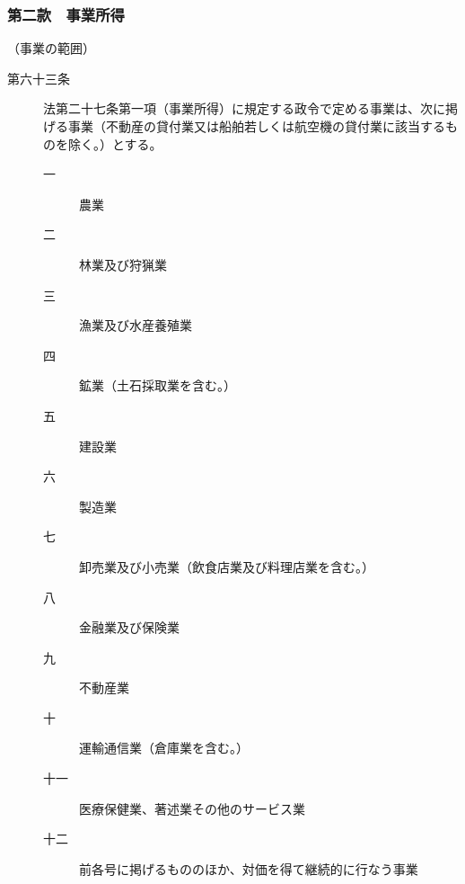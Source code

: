 \documentclass[twocolumn,a4j,10pt]{ltjtarticle}
\begin{document}
\subsubsection*{第二款　事業所得}
\noindent\hspace{10pt}（事業の範囲）
\begin{description}
\item[第六十三条]法第二十七条第一項（事業所得）に規定する政令で定める事業は、次に掲げる事業（不動産の貸付業又は船舶若しくは航空機の貸付業に該当するものを除く。）とする。
\begin{description}
\item[一]農業
\item[二]林業及び狩猟業
\item[三]漁業及び水産養殖業
\item[四]鉱業（土石採取業を含む。）
\item[五]建設業
\item[六]製造業
\item[七]卸売業及び小売業（飲食店業及び料理店業を含む。）
\item[八]金融業及び保険業
\item[九]不動産業
\item[十]運輸通信業（倉庫業を含む。）
\item[十一]医療保健業、著述業その他のサービス業
\item[十二]前各号に掲げるもののほか、対価を得て継続的に行なう事業
\end{description}
\end{description}
\end{document}
